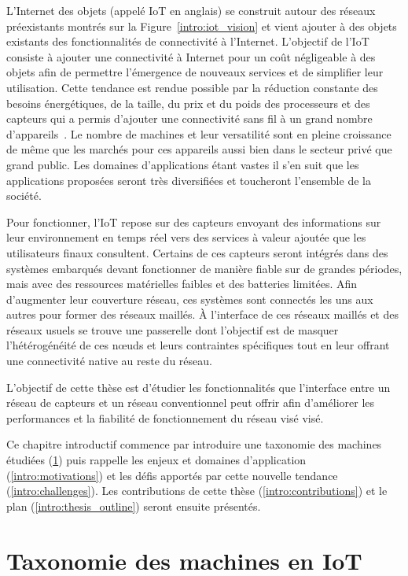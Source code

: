 L'Internet des objets (appelé \ac{IoT} en anglais) se construit autour des réseaux préexistants montrés sur la Figure~\ref{intro:iot_vision} et vient ajouter à des objets existants des fonctionnalités de connectivité à l'Internet.
L'objectif de l'\ac{IoT} consiste à ajouter une connectivité à Internet pour un coût négligeable à des objets afin de permettre l'émergence de nouveaux services et de simplifier leur utilisation.
Cette tendance est rendue possible par la réduction constante des besoins énergétiques, de la taille, du prix et du poids des processeurs et des capteurs qui a permis d'ajouter une connectivité sans fil à un grand nombre d'appareils~\cite{koomey2011implications}.
Le nombre de machines et leur versatilité sont en pleine croissance~\cite{gubbi2013internet} de même que les marchés pour ces appareils aussi bien dans le secteur privé que grand public.
Les domaines d'applications étant vastes il s'en suit que les applications proposées seront très diversifiées et toucheront l'ensemble de la société.

Pour fonctionner, l'\ac{IoT} repose sur des capteurs envoyant des informations sur leur environnement en temps réel vers des services à valeur ajoutée que les utilisateurs finaux consultent.
Certains de ces capteurs seront intégrés dans des systèmes embarqués devant fonctionner de manière fiable sur de grandes périodes, mais avec des ressources matérielles faibles et des batteries limitées.
Afin d'augmenter leur couverture réseau, ces systèmes sont connectés les uns aux autres pour former des réseaux maillés.
À l'interface de ces réseaux maillés et des réseaux usuels se trouve une passerelle dont l'objectif est de masquer l’hétérogénéité de ces nœuds et leurs contraintes spécifiques tout en leur offrant une connectivité native au reste du réseau.

L'objectif de cette thèse est d'étudier les fonctionnalités que l'interface entre un réseau de capteurs et un réseau conventionnel peut offrir afin d'améliorer les performances et la fiabilité de fonctionnement du réseau visé visé.


Ce chapitre introductif commence par introduire une taxonomie des machines étudiées (\ref{intro:taxonomy}) puis rappelle les enjeux et domaines d'application (\ref{intro:motivations}) et les défis apportés par cette nouvelle tendance (\ref{intro:challenges}).
Les contributions de cette thèse (\ref{intro:contributions}) et le plan (\ref{intro:thesis_outline}) seront ensuite présentés.

\section{Taxonomie des machines en \ac{IoT}}
\label{intro:taxonomy}

